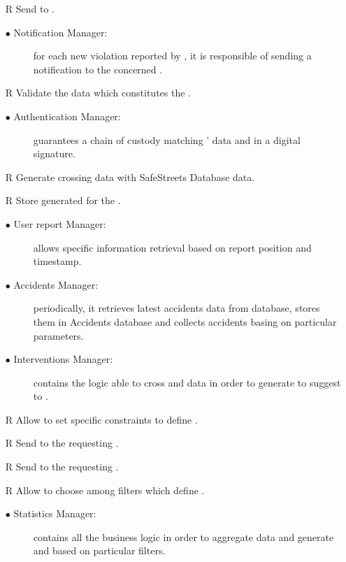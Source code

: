 \documentclass[../DD.tex]{subfiles}
\begin{document}
\begin{itemize}
	\item[R\subs{11}]Send  to .
	\begin{description}
	\item[$\bullet$ Notification Manager:] for each new violation reported by , it is responsible of sending a notification to the concerned . 
	\end{description}

	\item[R\subs{15}]Validate the data which constitutes the .
	\begin{description}
	\item[$\bullet$ Authentication Manager:] guarantees a chain of custody matching ' data and  in a digital signature.
	\end{description}

	\item[R\subs{16}]Generate  crossing   data with SafeStreets Database data.
	\item[R\subs{17}]Store generated  for the .
	\begin{description}
	\item[$\bullet$ User report Manager:] allows specific  information retrieval based on report position and timestamp.
	\item[$\bullet$ Accidents Manager:] periodically, it retrieves latest accidents data from  database, stores them in Accidents database and collects accidents basing on particular parameters.
	\item[$\bullet$ Interventions Manager:] contains the logic able to cross  and  data in order to generate  to suggest to .
	\end{description}
	
	\item[R\subs{18}]Allow  to set specific constraints to define .
	\item[R\subs{19}]Send  to the requesting .
	\item[R\subs{24}]Send  to the requesting .
	\item[R\subs{23}]Allow  to choose among filters which define .
	\begin{description}
	\item[$\bullet$ Statistics Manager:] contains all the business logic in order to aggregate  data and generate  and   based on particular filters.
	\end{description}
	

\end{itemize}
\end{document}

